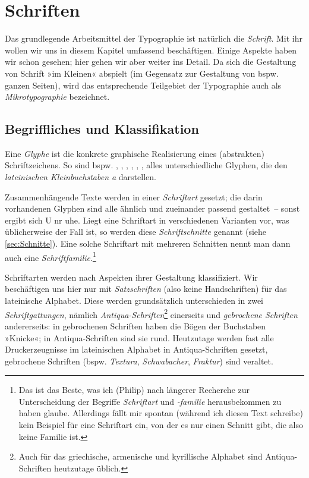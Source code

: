 \chapter{Schriften}
\label{ch:Schriften}

Das grundlegende Arbeitsmittel der Typographie ist natürlich die
\emph{Schrift}.  Mit ihr wollen wir uns in diesem Kapitel umfassend
beschäftigen.  Einige Aspekte haben wir schon gesehen; hier gehen wir
aber weiter ins Detail.  Da sich die Gestaltung von Schrift »im
Kleinen« abspielt (im Gegensatz zur Gestaltung von bspw. ganzen
Seiten), wird das entsprechende Teilgebiet der Typographie auch als
\emph{Mikrotypographie} bezeichnet.

\section{Begriffliches und Klassifikation}

Eine \emph{Glyphe} ist die konkrete graphische Realisierung eines
(abstrakten) Schriftzeichens.  So sind bspw. ,
, , ,
, ,  alles
unterschiedliche Glyphen, die den \emph{lateinischen Kleinbuchstaben
  a} darstellen.

Zusammenhängende Texte werden in einer \emph{Schriftart} gesetzt; die
darin vorhandenen Glyphen sind alle ähnlich und zueinander passend
gestaltet~-- sonst ergibt sich {U\selectfont
  n\selectfont r\selectfont
  u\selectfont h\selectfont e}.  Liegt
eine Schriftart in verschiedenen Varianten vor, was üblicherweise der
Fall ist, so werden diese \emph{Schriftschnitte} genannt (siehe
\cref{sec:Schnitte}).  Eine solche Schriftart mit mehreren Schnitten
nennt man dann auch eine \emph{Schriftfamilie}.\footnote{Das ist das
  Beste, was ich (Philip) nach längerer Recherche zur Unterscheidung
  der Begriffe \emph{Schriftart} und \emph{-familie} herausbekommen zu
  haben glaube.  Allerdings fällt mir spontan (während ich diesen Text
  schreibe) kein Beispiel für eine Schriftart ein, von der es nur
  einen Schnitt gibt, die also keine Familie ist.}

Schriftarten werden nach Aspekten ihrer Gestaltung klassifiziert.  Wir
beschäftigen uns hier nur mit \emph{Satzschriften} (also keine
Handschriften) für das lateinische Alphabet.  Diese werden
grundsätzlich unterschieden in zwei \emph{Schriftgattungen}, nämlich
\emph{Antiqua-Schriften}\footnote{Auch für das griechische, armenische
  und kyrillische Alphabet sind Antiqua-Schriften heutzutage üblich.}
einerseits und \emph{gebrochene Schriften} andererseits: in
gebrochenen Schriften haben die Bögen der Buchstaben »Knicke«; in
Antiqua-Schriften sind sie rund.  Heutzutage werden fast alle
Druckerzeugnisse im lateinischen Alphabet in Antiqua-Schriften
gesetzt, gebrochene Schriften (bspw. \emph{Textura},
\emph{Schwabacher}, \emph{Fraktur}) sind veraltet.

